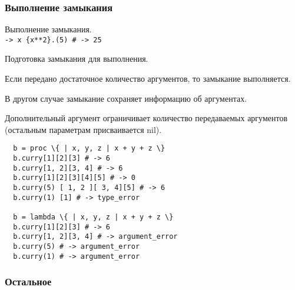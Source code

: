 \subsubsection*{Выполнение замыкания}

\begin{methodlist}
  Выполнение замыкания. 
  \\\verb!-> x {x**2}.(5) # -> 25!
 
  Подготовка замыкания для выполнения.

  Если передано достаточное количество аргументов, то замыкание выполняется.

  В другом случае замыкание сохраняет информацию об аргументах.

  Дополнительный аргумент ограничивает количество передаваемых аргументов (остальным параметрам присваивается nil).
  \begin{verbatim}
  b = proc \{ | x, y, z | x + y + z \} 
  b.curry[1][2][3] # -> 6 
  b.curry[1, 2][3, 4] # -> 6 
  b.curry[1][2][3][4][5] # -> 0 
  b.curry(5) [ 1, 2 ][ 3, 4][5] # -> 6 
  b.curry(1) [1] # -> type_error

  b = lambda \{ | x, y, z | x + y + z \} 
  b.curry[1][2][3] # -> 6 
  b.curry[1, 2][3, 4] # -> argument_error 
  b.curry(5) # -> argument_error 
  b.curry(1) # -> argument_error
  \end{verbatim}
\end{methodlist}

\subsubsection*{Остальное}


